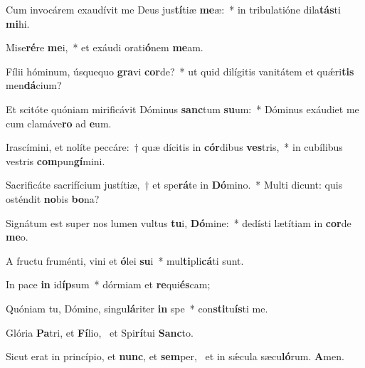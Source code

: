 \item Cum invocárem exaudívit me Deus jus\textbf{tí}tiæ \textbf{me}æ:~* in tribulatióne dila\textbf{tás}ti \textbf{mi}hi.
\item Mise\textbf{ré}re \textbf{me}i,~* et exáudi orati\textbf{ó}nem \textbf{me}am.
\item Fílii hóminum, úsquequo \textbf{gra}vi \textbf{cor}de?~* ut quid dilígitis vanitátem et quǽri\textbf{tis} men\textbf{dá}cium?
\item Et scitóte quóniam mirificávit Dóminus \textbf{sanc}tum \textbf{su}um:~* Dóminus exáudiet me cum clamáve\textbf{ro} ad \textbf{e}um.
\item Irascímini, et nolíte peccáre:~† quæ dícitis in \textbf{cór}dibus \textbf{ves}tris,~* in cubílibus vestris \textbf{com}pun\textbf{gí}mini.
\item Sacrificáte sacrifícium justítiæ,~† et spe\textbf{rá}te in \textbf{Dó}mino.~* Multi dicunt: quis osténdit \textbf{no}bis \textbf{bo}na?
\item Signátum est super nos lumen vultus \textbf{tu}i, \textbf{Dó}mine:~* dedísti lætítiam in \textbf{cor}de \textbf{me}o.
\item A fructu fruménti, vini et \textbf{ó}lei \textbf{su}i~* mul\textbf{ti}pli\textbf{cá}ti sunt.
\item In pace \textbf{in} id\textbf{íp}sum~* dórmiam et \textbf{re}qui\textbf{és}cam;
\item Quóniam tu, Dómine, singu\textbf{lá}riter \textbf{in} spe~* con\textbf{sti}tu\textbf{ís}ti me.
\item Glória \textbf{Pa}tri, et \textbf{Fí}lio,~\psstar{} et Spi\textbf{rí}tui \textbf{Sanc}to.
\item Sicut erat in princípio, et \textbf{nunc}, et \textbf{sem}per,~\psstar{} et in sǽcula sæcu\textbf{ló}rum. \textbf{A}men.
